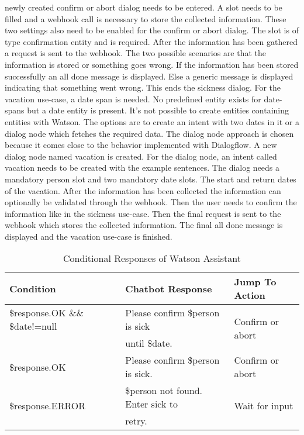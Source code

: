 newly created confirm or abort dialog needs to be entered.
A slot needs to be filled and a webhook call is necessary to store the 
collected information.
These two settings also need to be enabled for the confirm or abort dialog.
The slot is of type confirmation entity and is required.
After the information has been gathered a request is sent to the webhook.
The two possible scenarios are that the information is stored or 
something goes wrong.
If the information has been stored successfully an all done message is displayed.
Else a generic message is displayed indicating that something went wrong.
This ends the sickness dialog.
For the vacation use-case, a date span is needed.
No predefined entity exists for date-spans but a date entity is present.
It's not possible to create entities containing entities with Watson.
The options are to create an intent with two dates in it or a dialog node 
which fetches the required data.
The dialog node approach is chosen because it comes close to the 
behavior implemented with Dialogflow.
A new dialog node named vacation is created.
For the dialog node, an intent called vacation needs to be created with 
the example sentences.
The dialog needs a mandatory person slot and two mandatory date slots.
The start and return dates of the vacation.
After the information has been collected the information can optionally 
be validated through the webhook.
Then the user needs to confirm the information like in the sickness use-case.
Then the final request is sent to the webhook which stores the 
collected information.
The final all done message is displayed and the vacation use-case is finished.

\begin{table}[H]
    \centering
    \begin{tabular}{ l | l | l  }
  Condition & Chatbot Response & Jump To Action \\ \hline \hline
  \$response.OK \&\& \$date!=null & Please confirm \$person is sick & \multirow{2}{*}{Confirm or abort} \\
        & until \$date. & \\ \hline
  \$response.OK & Please confirm \$person is sick. & Confirm or abort \\ \hline
  \multirow{2}{*}{\$response.ERROR} & \$person not found. Enter sick to & \multirow{2}{*}{Wait for input} \\ 
  &  retry. & \\ \hline

\end{tabular}
    \caption{Conditional Responses of Watson Assistant} \label{tab:watson_cond_response}
\end{table} \noindent



